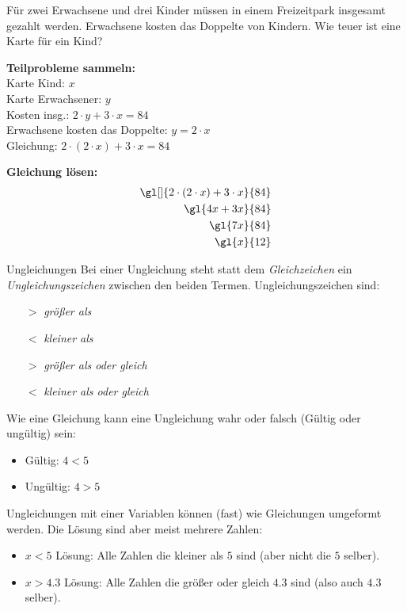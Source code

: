 \documentclass[12pt,a5paper,landscape]{scrartcl}
\begin{document}
\begin{loesungskarte}
\begin{rahmen}
	Für \textcolor{\lsgFarbe}{zwei Erwachsene} und \textcolor{\lsgFarbe}{drei Kinder} müssen in einem Freizeitpark insgesamt \textcolor{\lsgFarbe}{} gezahlt werden. \textcolor{\lsgFarbe}{Erwachsene kosten das Doppelte von Kindern.} Wie teuer ist eine Karte für ein Kind?
\end{rahmen}
	
\begin{multicols}{2}
	\textbf{Teilprobleme sammeln:} \\
	Karte Kind: $x$ \\
	Karte Erwachsener: $y$ \\
	Kosten insg.: $2\cdot y + 3\cdot x = 84$ \\
	Erwachsene kosten das Doppelte: $y = 2\cdot x$ \\
	Gleichung: $2\cdot (2\cdot x) + 3\cdot x = 84$
	
	\columnbreak
	\textbf{Gleichung lösen:}
	\begin{alignat*}{3}
		\gl[]{2\cdot (2\cdot x) + 3\cdot x}{84} \\
		\gl{4x + 3x}{84} \\
		\gl{7x}{84} \\
		\gl{x}{12}
	\end{alignat*}
\end{multicols}

\begin{hilfekarte}{Ungleichungen}
	Bei einer Ungleichung steht statt dem \emph{Gleichzeichen} ein \emph{Ungleichungszeichen} zwischen den beiden Termen. Ungleichungszeichen sind:
	\begin{itemize}
		\item[$>$] \emph{größer als}
		\item[$<$] \emph{kleiner als}
		\item[$\gt$] \emph{größer als oder gleich}
		\item[$\lt$] \emph{kleiner als oder gleich}
	\end{itemize}
	
	Wie eine Gleichung kann eine Ungleichung wahr oder falsch (Gültig oder ungültig) sein:
	\begin{itemize}
		\item Gültig: $4 < 5$
		\item Ungültig: $4 \gt 5$
	\end{itemize}
	
	Ungleichungen mit einer Variablen können (fast) wie Gleichungen umgeformt werden. Die Lösung sind aber meist mehrere Zahlen:
	\begin{itemize}
		\item $x < 5$ Lösung: Alle Zahlen die kleiner als $5$ sind (aber nicht die $5$ selber).
		\item $x \gt 4.3$ Lösung: Alle Zahlen die größer oder gleich $4.3$ sind (also auch $4.3$ selber).
	\end{itemize}
\end{hilfekarte}


\end{loesungskarte}
\end{document}
